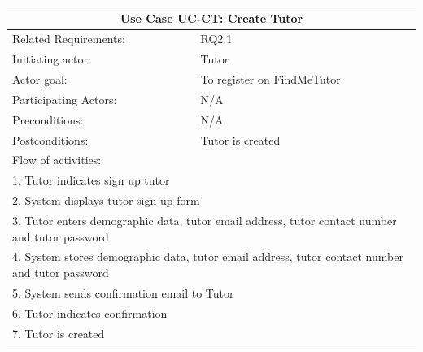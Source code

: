 \documentclass[12pt]{article}
\begin{document}
{\begin{tabular}{| l | l| }
			\hline\multicolumn{2}{|c|}{ \textbf{Use Case UC-CT: Create Tutor}} \\ \hline
			Related Requirements: & RQ2.1 \\ \hline
			Initiating actor: & Tutor \\ \hline
			Actor goal: & To register on FindMeTutor\\ \hline
			Participating Actors: & N/A\\ \hline
			Preconditions: & N/A\\ \hline
			Postconditions: & Tutor is created\\ \hline
			\multicolumn{2}{|l|}{Flow of activities:}\\ \hline
			\multicolumn{2}{|p{15cm}|}{1. Tutor indicates sign up tutor}\\
			\multicolumn{2}{|p{15cm}|}{2. System displays tutor sign up form}\\
			\multicolumn{2}{|p{15cm}|}{3. Tutor enters demographic data, tutor email address, tutor contact number and tutor password}	\\		
			\multicolumn{2}{|p{15cm}|}{4. System stores demographic data, tutor email address, tutor contact number and tutor password}\\
			\multicolumn{2}{|l|}{5. System sends confirmation email to Tutor}\\
			\multicolumn{2}{|l|}{6. Tutor indicates confirmation}	\\
			\multicolumn{2}{|l|}{7. Tutor is created}	
			\\ \hline		
		\end{tabular}



}
\end{document}
